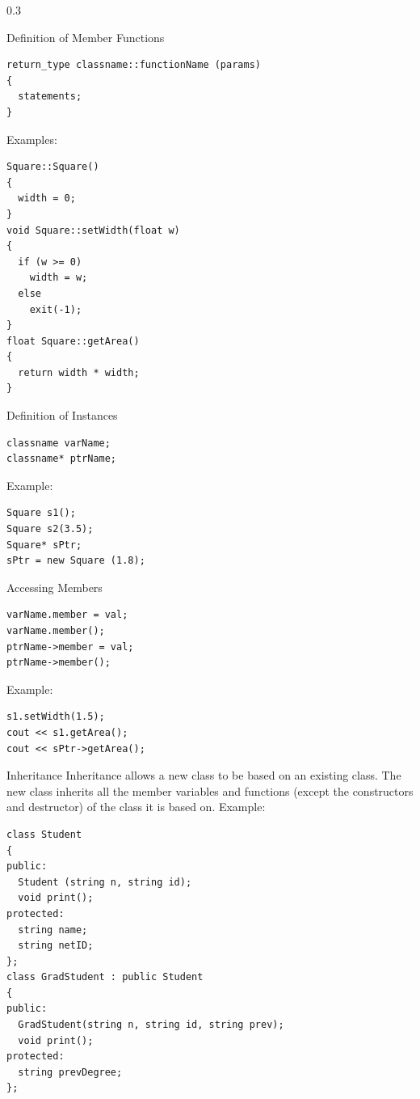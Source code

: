\documentclass[final]{beamer}
\begin{document}
\begin{frame}[t,fragile]
\begin{columns}[t,totalwidth=0.95\paperwidth, colsep=0.05\paperwidth]
\begin{column}{0.3\paperwidth}
\begin{block}{Definition of Member Functions}
\begin{lstlisting}
return_type classname::functionName (params)
{
  statements;
}
\end{lstlisting}
Examples:
\begin{lstlisting}
Square::Square()
{
  width = 0;
}
void Square::setWidth(float w)
{
  if (w >= 0)
    width = w;
  else
    exit(-1);
}
float Square::getArea()
{
  return width * width;
}
\end{lstlisting}
\end{block}

\begin{block}{Definition of Instances}
\begin{lstlisting}
classname varName;
classname* ptrName;
\end{lstlisting}
Example:
\begin{lstlisting}
Square s1();
Square s2(3.5);
Square* sPtr;
sPtr = new Square (1.8);
\end{lstlisting}
\end{block}

\begin{block}{Accessing Members}
\begin{lstlisting}
varName.member = val;
varName.member();
ptrName->member = val;
ptrName->member();
\end{lstlisting}
Example:
\begin{lstlisting}
s1.setWidth(1.5);
cout << s1.getArea();
cout << sPtr->getArea();
\end{lstlisting}
\end{block}

\begin{block}{Inheritance}
Inheritance allows a new class to be based on an existing class. The new class inherits all the member variables and functions (except the constructors and destructor) of the class it is based on.
Example:
\begin{lstlisting}
class Student
{
public:
  Student (string n, string id);
  void print();
protected:
  string name;
  string netID;
};
class GradStudent : public Student
{
public:
  GradStudent(string n, string id, string prev);
  void print();
protected:
  string prevDegree;
};
\end{lstlisting}
\end{block}


\end{column}
\end{columns}
\end{frame}
\end{document}
